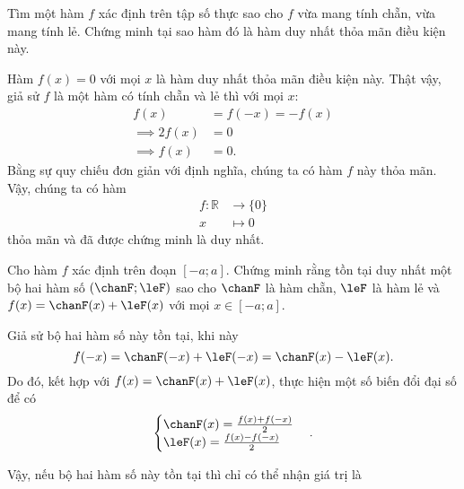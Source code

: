 \exercise Tìm một hàm $f$ xác định trên tập số thực sao cho $f$ vừa mang tính chẵn, vừa mang tính lẻ. Chứng minh tại sao hàm đó là hàm duy nhất thỏa mãn điều kiện này.

\solution 

Hàm $f(x) = 0$ với mọi $x$ là hàm duy nhất thỏa mãn điều kiện này. Thật vậy, giả sử $f$ là một hàm có tính chẵn và lẻ thì với mọi $x$: 
\begin{align*}
   f(x) &= f(-x) = -f(x) \\
   \implies 2f(x) &= 0 \\
   \implies f(x) &= 0.
\end{align*}
Bằng sự quy chiếu đơn giản với định nghĩa, chúng ta có hàm $f$ này thỏa mãn. Vậy, chúng ta có hàm \begin{align*}
   f: \mathbb{R} &\to \{0\} \\
         x &\mapsto 0
\end{align*} thỏa mãn và đã được chứng minh là duy nhất.

\exercise Cho hàm $f$ xác định trên đoạn $[-a; a]$. Chứng minh rằng tồn tại duy nhất một bộ hai hàm số $\left(\chanF; \leF\right)$ sao cho $\chanF$ là hàm chẵn, $\leF$ là hàm lẻ và $f(x) = \chanF(x) + \leF(x)$ với mọi $x \in [-a; a]$.

\solution

Giả sử bộ hai hàm số này tồn tại, khi này
$$
f(-x) = \chanF(-x) + \leF(-x) = \chanF(x) - \leF(x).
$$
Do đó, kết hợp với $f(x) = \chanF(x) + \leF(x)$, thực hiện một số biến đổi đại số để có \begin{equation*}
   \begin{cases}
      \chanF(x) = \frac{f(x) + f(-x)}{2} \\
      \leF(x) = \frac{f(x) - f(-x)}{2}
   \end{cases}.
\end{equation*}

Vậy, nếu bộ hai hàm số này tồn tại thì chỉ có thể nhận giá trị là 
